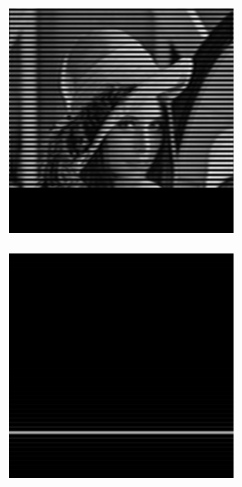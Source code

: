 \begin{figure}[ht!]
\begin{subfigure}[t]{0.23\textwidth}
      \caption{}
  \end{subfigure}\hfill
  \begin{subfigure}[t]{0.23\textwidth}
      \centering
      \includegraphics[width=\textwidth]{sim_slit/1/sim_vert_frame}
      \caption{}
  \end{subfigure}\hfill
  \begin{subfigure}[t]{0.23\textwidth}
      \centering
      \includegraphics[width=\textwidth]{sim_slit/1/sim_slit_pattern}

\end{subfigure}
\end{figure}
